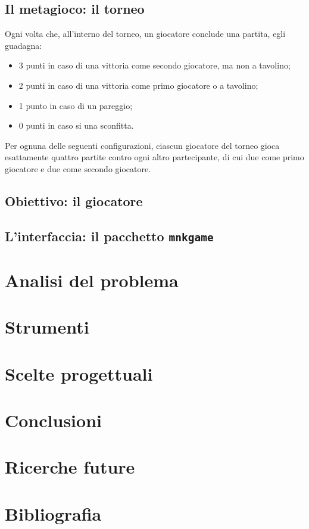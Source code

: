 \documentclass[a4paper]{article}
\begin{document}
\subsection{Il metagioco: il torneo}

Ogni volta che, all'interno del torneo, un giocatore conclude una partita, egli
guadagna: 
\begin{itemize}
  \item 3 punti in caso di una vittoria come secondo giocatore, ma non a tavolino;
  \item 2 punti in caso di una vittoria come primo giocatore o a tavolino;
  \item 1 punto in caso di un pareggio;
  \item 0 punti in caso si una sconfitta.
\end{itemize}

\noindent 
Per ognuna delle seguenti configurazioni, ciascun giocatore del torneo gioca
esattamente quattro partite contro ogni altro partecipante, di cui due come
primo giocatore e due come secondo giocatore.


\subsection{Obiettivo: il giocatore}

\subsection{L'interfaccia: il pacchetto \verb!mnkgame!}

\section{Analisi del problema}

\section{Strumenti}

\section{Scelte progettuali}

\section{Conclusioni}

\section{Ricerche future}

\section{Bibliografia}
\end{document}
